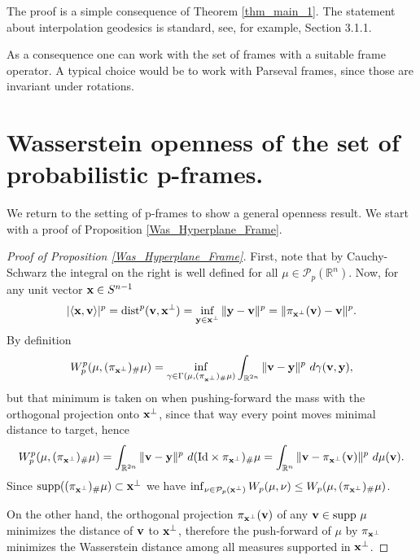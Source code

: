 \documentclass{amsart}
\numberwithin{equation}{section}
\newcommand\cP{{\mathcal P}}
\newcommand\bA{{\bf A}}
\newcommand\bS{{\bf S}}
\newcommand\R{{\mathbb R}}
\newcommand\supp{{\operatorname{supp}}}
\theoremstyle{plain}
\theoremstyle{definition}
\begin{document}
The proof is a simple consequence of Theorem \ref{thm_main_1}. The statement about interpolation geodesics is standard, see, for example, \cite{figalli-glaudo} Section 3.1.1.   

As a consequence one can work with the set of frames with a suitable frame operator. A typical choice would be to work with 
Parseval frames, since those are invariant under rotations.    
 






\section{Wasserstein openness of the set of probabilistic p-frames.}
We return to the setting of p-frames to show a general openness result.  
We start with a proof of Proposition \ref{Was_Hyperplane_Frame}. 
\begin{proof}[Proof of Proposition \ref{Was_Hyperplane_Frame}]\label{proof_prop_2_3}
First, note that by Cauchy-Schwarz the integral on the right is well defined for all $\mu \in \cP_p(\R^n)$. 
Now, for any unit vector ${\bf x} \in S^{n-1}$  
\begin{equation}\label{p-dist-identity}
|\langle {\bf x}, {\bf v} \rangle|^p=\text{dist}^p( {\bf v}, {\bf x}^{\perp})= \inf_{{\bf y} \in {\bf x}^{\perp}}\|{\bf y}-{\bf v}\|^p  
= \|\pi_{{\bf x}^{\perp}}({\bf v})-{\bf v}\|^p.
\end{equation} 
By definition
$$W^p_p(\mu, (\pi_{{\bf x}^{\perp}})_{\#}\mu)=\inf_{\gamma \in \Gamma(\mu, (\pi_{{\bf x}^{\perp}})_{\#}\mu)}
\int_{\R^{2n}} \|{\bf v}-{\bf y}\|^p\ d\gamma({\bf v},{\bf y}),
$$
but that minimum is taken on when pushing-forward the mass with the orthogonal projection onto ${\bf x}^{\perp}$, since that way every point moves minimal distance to target, hence 
$$W^p_p(\mu, (\pi_{{\bf x}^{\perp}})_{\#}\mu)=\int_{\R^{2n}}\|{\bf v}-{\bf y}\|^p\ d (\text{Id}\times \pi_{{\bf x}^{\perp}})_{\#}\mu=\int_{\R^n}\|{\bf v}- \pi_{{\bf x}^{\perp}}({\bf v})\|^p\ d \mu({\bf v}).
$$
Since $\text{supp}((\pi_{{\bf x}^{\perp}})_{\#}\mu) \subset {\bf x}^{\perp}$ we have 
 $ \inf_{\nu \in \cP_p({\bf x}^{\perp}) } W_p(\mu, \nu) \leq W_p(\mu, (\pi_{{\bf x}^{\perp}})_{\#}\mu)$. 
 
On the other hand, the  orthogonal projection $\pi_{{\bf x}^{\perp}}({\bf v})$ of any ${\bf v} \in \supp\ \mu$ minimizes the distance of ${\bf v}$  to ${\bf x}^{\perp}$,  therefore the push-forward of $\mu$ by  $\pi_{{\bf x}^{\perp}}$ minimizes the Wasserstein distance among all measures supported in ${\bf x}^{\perp}$. 
\end{proof}
\end{document}
